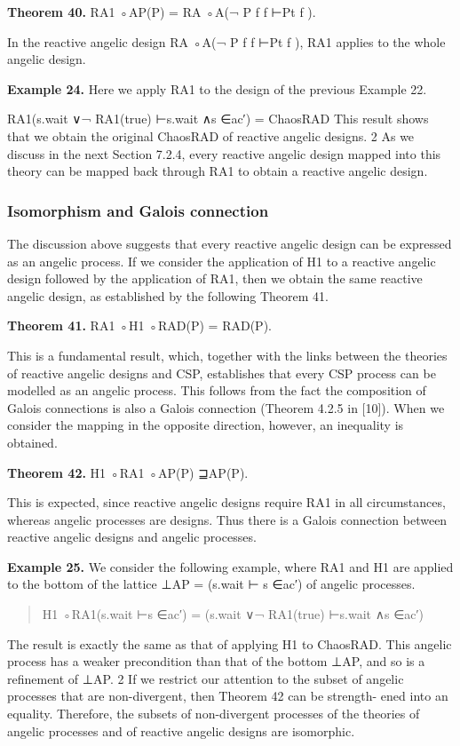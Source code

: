 \documentclass[11pt]{article}
\begin{document}
\noindent\textbf{Theorem 40.} RA1 ◦AP(P) = RA ◦A(¬ P f f ⊢Pt f ).


In the reactive angelic design RA ◦A(¬ P f f ⊢Pt f ), RA1 applies to the whole angelic design.

\noindent\textbf{Example 24.} Here we apply RA1 to the design of the previous Example 22.


RA1(s.wait ∨¬ RA1(true) ⊢s.wait ∧s ∈ac′) = ChaosRAD This result shows that we obtain the original ChaosRAD of reactive angelic designs. 2 As we discuss in the next Section 7.2.4, every reactive angelic design mapped into this theory can be mapped back through RA1 to obtain a reactive angelic design.

\subsubsection{Isomorphism and Galois connection}
The discussion above suggests that every reactive angelic design can be expressed as an angelic process. If we consider the application of H1 to a reactive angelic design followed by the application of RA1, then we obtain the same reactive angelic design, as established by the following Theorem 41.

\noindent\textbf{Theorem 41.} RA1 ◦H1 ◦RAD(P) = RAD(P).


This is a fundamental result, which, together with the links between the theories of reactive angelic designs and CSP, establishes that every CSP process can be modelled as an angelic process. This follows from the fact the composition of Galois connections is also a Galois connection (Theorem 4.2.5 in [10]). When we consider the mapping in the opposite direction, however, an inequality is obtained.

\noindent\textbf{Theorem 42.} H1 ◦RA1 ◦AP(P) ⊒AP(P).


This is expected, since reactive angelic designs require RA1 in all circumstances, whereas angelic processes are designs. Thus there is a Galois connection between reactive angelic designs and angelic processes.

\noindent\textbf{Example 25.} We consider the following example, where RA1 and H1 are applied to the bottom of the lattice ⊥AP = (s.wait ⊢ s ∈ac′) of angelic processes.


\begin{quote}\small\raggedright
H1 ◦RA1(s.wait ⊢s ∈ac′) = (s.wait ∨¬ RA1(true) ⊢s.wait ∧s ∈ac′)
\end{quote}

The result is exactly the same as that of applying H1 to ChaosRAD. This angelic process has a weaker precondition than that of the bottom ⊥AP, and so is a refinement of ⊥AP. 2 If we restrict our attention to the subset of angelic processes that are non-divergent, then Theorem 42 can be strength- ened into an equality. Therefore, the subsets of non-divergent processes of the theories of angelic processes and of reactive angelic designs are isomorphic.
\end{document}

